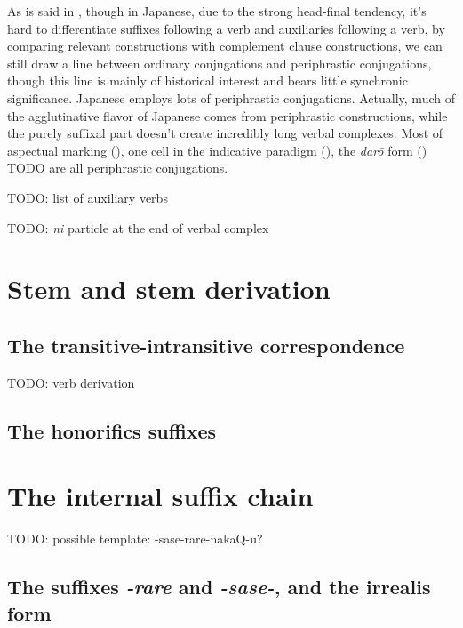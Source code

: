 \documentclass[UTF8, a4paper, oneside, scheme=plain]{ctexrep}
\newcommand{\corpus}[1]{\emph{#1}}
\begin{document}
As is said in ,
though in Japanese, 
due to the strong head-final tendency,
it's hard to differentiate
suffixes following a verb and auxiliaries following a verb,
by comparing relevant constructions with complement clause constructions, 
we can still draw a line between ordinary conjugations and periphrastic conjugations,
though this line is mainly of historical interest and bears little synchronic significance.
Japanese employs lots of periphrastic conjugations.
Actually, much of the agglutinative flavor of Japanese comes from periphrastic constructions,
while the purely suffixal part doesn't create incredibly long verbal complexes.
Most of aspectual marking (), 
one cell in the indicative paradigm (), 
the \corpus{{dar\={o}}} form () TODO 
are all periphrastic conjugations.

TODO: list of auxiliary verbs

TODO: \corpus{ni} particle at the end of verbal complex

\section{Stem and stem derivation}\label{sec:verb-stem}

\subsection{The transitive-intransitive correspondence}

TODO: verb derivation

\subsection{The honorifics suffixes}\label{sec:verb-honorifics}

\section{The internal suffix chain}\label{sec:internal-suffix-chain}

TODO: possible template: -sase-rare-nakaQ-u?

\subsection{The suffixes \corpus{-rare} and \corpus{-sase-}, and the irrealis form}\label{sec:valency-irrealis}
\end{document}
